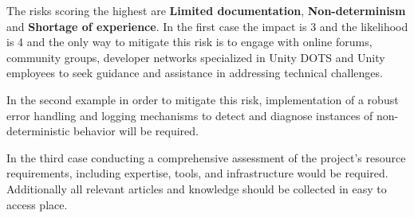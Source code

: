 The risks scoring the highest are \textbf{Limited documentation}, \textbf{Non-determinism} and \textbf{Shortage of experience}. In the first case the impact is 3 and the likelihood is 4 and the only way to mitigate this risk is to engage with online forums, community groups, developer networks specialized in Unity DOTS and Unity employees to seek guidance and assistance in addressing technical challenges.

In the second example in order to mitigate this risk, implementation of a robust error handling and logging mechanisms to detect and diagnose instances of non-deterministic behavior will be required.

In the third case conducting a comprehensive assessment of the project's resource requirements, including expertise, tools, and infrastructure would be required. Additionally all relevant articles and knowledge should be collected in easy to access place.